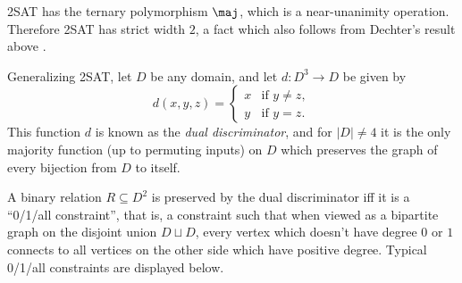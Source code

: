 \begin{ex} 2SAT has the ternary polymorphism $\maj$, which is a near-unanimity operation. Therefore 2SAT has strict width $2$, a fact which also follows from Dechter's result above \cite{dechter}.
\end{ex}

\begin{ex}\label{ex-dual-discriminator} Generalizing 2SAT, let $D$ be any domain, and let $d : D^3 \rightarrow D$ be given by
\[
d(x,y,z) = \begin{cases}x & \text{if } y \ne z,\\ y & \text{if } y = z.\end{cases}
\]
This function $d$ is known as the \emph{dual discriminator}, and for $|D| \ne 4$ it is the only majority function (up to permuting inputs) on $D$ which preserves the graph of every bijection from $D$ to itself.

A binary relation $R \subseteq D^2$ is preserved by the dual discriminator iff it is a ``0/1/all constraint'', that is, a constraint such that when viewed as a bipartite graph on the disjoint union $D \sqcup D$, every vertex which doesn't have degree $0$ or $1$ connects to all vertices on the other side which have positive degree. Typical 0/1/all constraints are displayed below.


\end{ex}
